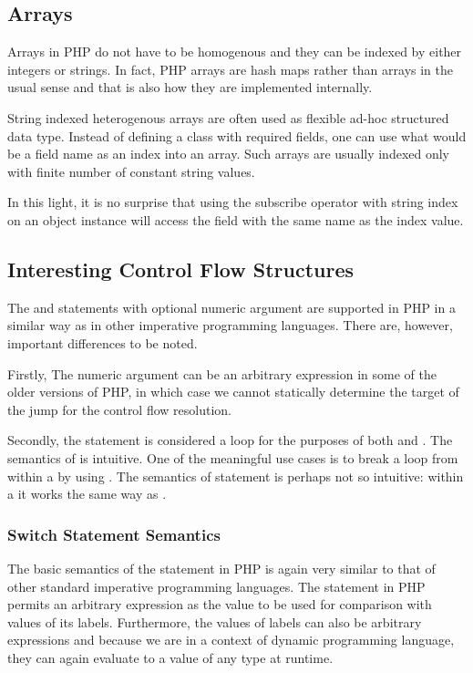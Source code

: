 
    \subsection{Arrays}
    Arrays in PHP do not have to be homogenous and 
    they can be indexed by either integers or strings.
    In fact, PHP arrays are hash maps rather than arrays 
    in the usual sense and that is also how they are 
    implemented internally. 
    
    String indexed heterogenous arrays are often used 
    as flexible ad-hoc structured data type. 
    Instead of defining a class 
    with required fields, one can use what would be a 
    field name as an index into an array. Such arrays 
    are usually indexed only with finite number of 
    constant string values. 
    
    In this light, it is no 
    surprise that using the subscribe operator 
    \code{[]} with string index on an object instance will 
    access the field with the same name as the index value.

    \subsection{Interesting Control Flow Structures}
    The  and  statements with 
    optional numeric argument are supported in PHP in a 
    similar way as in other imperative programming 
    languages. There are, however, important differences 
    to be noted.
    
    Firstly, The numeric argument can be an arbitrary 
    expression in some of the older versions of PHP, in which 
    case we cannot statically determine the target of 
    the jump for the control flow resolution.
    
    Secondly, the  statement is considered 
    a loop for the purposes of both  and 
    . The semantics of  
    is intuitive. One of the meaningful use cases is to 
    break a loop from within a  by 
    using . The semantics of 
     statement 
    is perhaps not so intuitive: within a  
    it works the same way as .
    
    \subsubsection*{Switch Statement Semantics} 
    The basic semantics of the  statement in PHP is 
    again very similar to that of other standard imperative 
    programming languages. The  statement in PHP 
    permits an arbitrary expression as the value to be used 
    for comparison with values of its  labels. Furthermore, 
    the values of  labels can also be arbitrary 
    expressions and because we are in a context of dynamic 
    programming language, they can again evaluate to a value 
    of any type at runtime.
    
